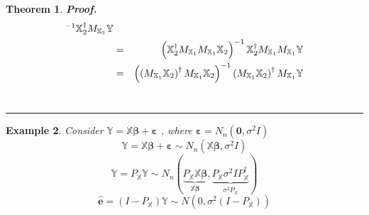 \documentclass{article}
\newtheorem{theorem}{Theorem}
\newtheorem{example}[theorem]{Example}
\newenvironment{proof}[1][Proof]{\noindent\textbf{#1.} }{\ \rule{0.5em}{0.5em}}
\begin{document}
\begin{theorem}
\begin{proof}
\begin{eqnarray*}
^{-1}\mathbb{X}_{2}^{\dagger }M_{\mathbb{X}_{1}}\mathbb{Y} \\
&=&\left( \mathbb{X}_{2}^{\dagger }M_{\mathbb{X}_{1}}M_{\mathbb{X}_{1}}%
\mathbb{X}_{2}\right) ^{-1}\mathbb{X}_{2}^{\dagger }M_{\mathbb{X}_{1}}M_{%
\mathbb{X}_{1}}\mathbb{Y} \\
&=&\left( \left( M_{\mathbb{X}_{1}}\mathbb{X}_{2}\right) ^{\dagger }M_{%
\mathbb{X}_{1}}\mathbb{X}_{2}\right) ^{-1}\left( M_{\mathbb{X}_{1}}\mathbb{X}%
_{2}\right) ^{\dagger }M_{\mathbb{X}_{1}}\mathbb{Y}
\end{eqnarray*}
\end{proof}
\end{theorem}

\bigskip 

\begin{example}
Consider $\mathbb{Y}=\mathbb{X}\boldsymbol{\beta }+\boldsymbol{\varepsilon }$%
, where $\boldsymbol{\varepsilon }=N_{n}\left( \boldsymbol{0},\sigma
^{2}I\right) $%
\begin{equation*}
\mathbb{Y}=\mathbb{X}\boldsymbol{\beta }+\boldsymbol{\varepsilon }\sim
N_{n}\left( \mathbb{X}\boldsymbol{\beta },\sigma ^{2}I\right) 
\end{equation*}%
\begin{equation*}
\mathbb{\hat{Y}}=P_{\mathbb{X}}\mathbb{Y}\sim N_{n}\left( \underset{\mathbb{X%
}\boldsymbol{\beta }}{\underbrace{P_{\mathbb{X}}\mathbb{X}\boldsymbol{\beta }%
}},\underset{\sigma ^{2}P_{\mathbb{X}}}{\underbrace{P_{\mathbb{X}}\sigma
^{2}IP_{\mathbb{X}}^{\dagger }}}\right) 
\end{equation*}%
\begin{equation*}
\boldsymbol{\hat{e}}=\left( I-P_{\mathbb{X}}\right) \mathbb{Y}\sim N\left(
0,\sigma ^{2}\left( I-P_{\mathbb{X}}\right) \right) 
\end{equation*}
\end{example}
\end{document}
